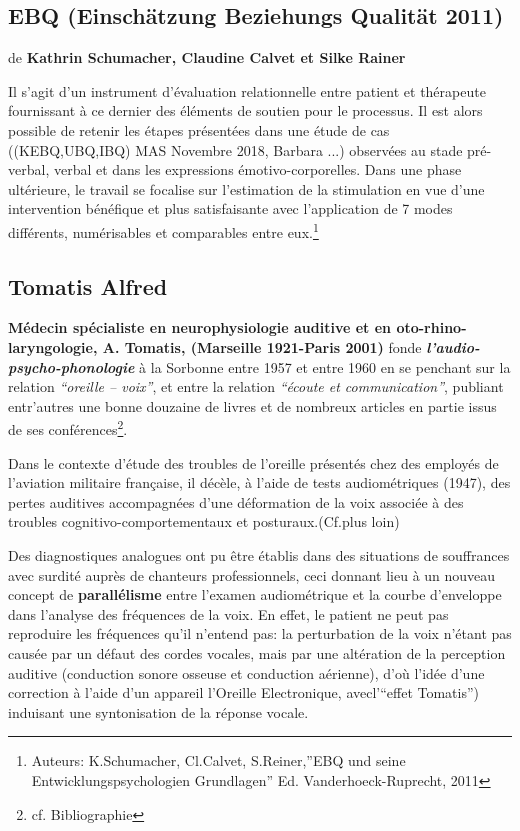 \subsection{EBQ (Einschätzung Beziehungs Qualität 2011)}
de \textbf{Kathrin Schumacher, Claudine Calvet et Silke Rainer}

  Il s'agit d'un instrument d'évaluation relationnelle entre patient et
thérapeute fournissant à ce dernier des éléments de soutien pour le
processus. Il est alors possible de retenir les étapes présentées dans une étude de cas
((KEBQ,UBQ,IBQ) MAS Novembre 2018,
Barbara ...) observées au stade pré-verbal, verbal et dans les expressions
émotivo-corporelles.
Dans une phase ultérieure, le travail se focalise sur l'estimation de
la stimulation en vue d'une intervention bénéfique et plus
satisfaisante avec l'application de 7 modes différents, numérisables
et comparables entre eux.\footnote{ Auteurs: K.Schumacher,
  Cl.Calvet, S.Reiner,''EBQ und seine Entwicklungspsychologien Grundlagen'' Ed. Vanderhoeck-Ruprecht, 2011 } 




  



  
\subsection{Tomatis Alfred}

\textbf{Médecin spécialiste en neurophysiologie auditive et en
oto-rhino-laryngologie, A. Tomatis, (Marseille 1921-Paris 2001) } fonde
\textit{\textbf{l'audio-psycho-phonologie }} à la Sorbonne entre 
1957 et entre 1960 en  se penchant sur la relation 
\textit{``oreille -- voix''}, et entre la relation \textit{``écoute
et communication''}, publiant entr'autres une bonne douzaine de livres et de nombreux
articles en partie issus de ses
conférences\footnote{cf. Bibliographie}.

Dans le contexte d'étude des troubles de
l'oreille présentés chez des employés de l'aviation militaire
française, il décèle, à l'aide
de tests audiométriques
 (1947), des pertes auditives accompagnées d'une
déformation de la voix associée à des troubles
cognitivo-comportementaux et posturaux.(Cf.plus loin)

Des diagnostiques analogues ont pu être établis dans des situations
de souffrances avec surdité auprès de chanteurs professionnels,
ceci donnant lieu
à un nouveau concept de
\textbf{parallélisme } entre l'examen audiométrique et la courbe
d'enveloppe dans l'analyse des fréquences de la voix.
En effet, le patient ne peut pas reproduire les fréquences qu'il
n'entend pas: 
la perturbation de la voix n'étant pas causée par un défaut des cordes
vocales, mais par une altération de la perception auditive (conduction
sonore osseuse et conduction aérienne), d'où
l'idée d'une correction à l'aide d'un appareil l'Oreille
Electronique, avecl'``effet Tomatis'') induisant
une syntonisation de la réponse vocale.

